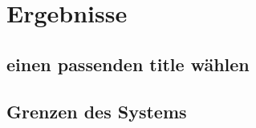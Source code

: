 \section{Ergebnisse}
    \subsection{einen passenden title wählen}


    \subsection{Grenzen des Systems}
